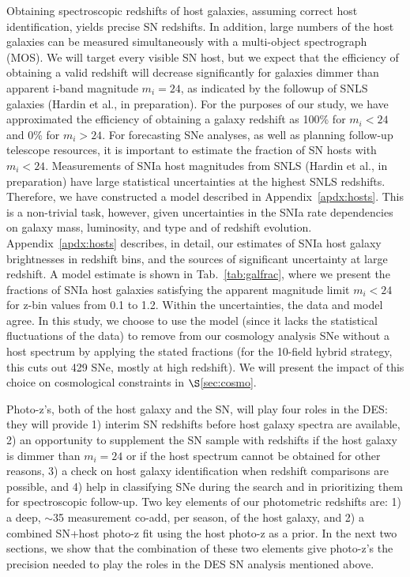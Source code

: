 \documentclass[preprint2]{aastex}    %
\begin{document}
Obtaining spectroscopic redshifts of host galaxies, assuming correct host identification, yields 
precise SN redshifts. In addition, large numbers of the host galaxies can be measured simultaneously
with a multi-object spectrograph (MOS). We will target every visible SN host, but we expect 
that the efficiency of obtaining a valid redshift will decrease significantly for galaxies 
dimmer than apparent i-band magnitude $m_i=24$, as indicated by the followup of SNLS galaxies 
(Hardin et al., in preparation). For the purposes of our study, we have approximated the 
efficiency of obtaining a galaxy redshift as 100\% for $m_i<24$ and 0\% for $m_i>24$. 
For forecasting SNe analyses, as well as
planning follow-up telescope resources, it is important to estimate the
fraction of SN hosts with $m_i<24$. Measurements of SNIa host magnitudes from SNLS 
(Hardin et al., in preparation) have large statistical uncertainties 
at the highest SNLS redshifts. Therefore, we 
have constructed a model described in Appendix~\ref{apdx:hosts}.  
This is a non-trivial task, however, given
uncertainties in the SNIa rate dependencies on galaxy mass, luminosity, and type and of
redshift evolution.  Appendix~\ref{apdx:hosts} describes, in detail, our
estimates of SNIa host galaxy brightnesses in redshift bins, and the 
sources of significant uncertainty at large redshift. A model estimate 
is shown in Tab.~\ref{tab:galfrac}, where we present the fractions of SNIa host galaxies satisfying the 
apparent magnitude limit $m_i<24$ for z-bin values from 0.1 to 1.2.  
Within the uncertainties, the data and model agree. In this study, we choose
to  use the model (since it lacks the statistical fluctuations of the data) 
to remove from our cosmology analysis SNe without a host spectrum by applying the stated 
fractions (for the 10-field hybrid strategy, this cuts out 429 SNe, mostly at high redshift).  We will
present the impact of this choice on cosmological constraints in $\S$\ref{sec:cosmo}. 

Photo-z's, both of the host galaxy and the SN, will play four
roles in the DES: they will provide 1) interim SN redshifts before host galaxy 
spectra are available, 2) an opportunity to supplement the SN sample with 
redshifts if the host galaxy is dimmer than $m_i=24$ or if the host spectrum 
cannot be obtained for other reasons, 3) a check on host galaxy identification 
when redshift comparisons are possible, and 4) help in classifying SNe 
during the search and in prioritizing them for spectroscopic follow-up. 
Two key elements of our photometric redshifts are: 1) a deep, $\sim$35 measurement 
co-add, per season, of the host galaxy, and 2) a combined SN+host photo-z
fit using the host photo-z as a prior. In the next two 
sections, we show that the combination of these two elements give 
photo-z's the precision needed to play the roles in the DES SN analysis
mentioned above. 
\end{document}
